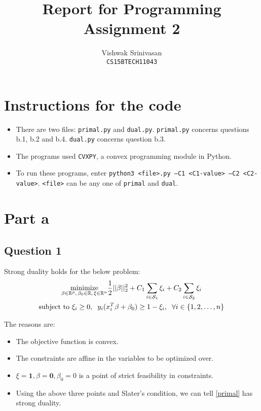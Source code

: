 \documentclass{article}
\title{Report for Programming Assignment 2}
\author{Vishwak Srinivasan\\
\texttt{CS15BTECH11043}}
\date{}
\newcommand{\setS}{\mathcal{S}}
\newcommand{\real}{\mathbb{R}}
\newcommand{\minimize}{\mathop{\mathrm{minimize}}}
\newcommand{\minimizewrt}[1]{\underset{#1}{\minimize}}
\begin{document}
\maketitle

\section*{Instructions for the code}
\begin{itemize}
\item There are two files: \texttt{primal.py} and \texttt{dual.py}. \texttt{primal.py} concerns questions b.1, b.2 and b.4. \texttt{dual.py} concerns question b.3.
\item The programs used \texttt{CVXPY}, a convex programming module in Python.
\item To run these programs, enter \texttt{python3 <file>.py --C1 <C1-value> --C2 <C2-value>}. \texttt{<file>} can be any one of \texttt{primal} and \texttt{dual}.
\end{itemize}

\section*{Part a}
\subsection*{Question 1}
\begin{flushleft}
Strong duality holds for the below problem:
\begin{multline}
\label{primal}
\minimizewrt{\beta \in \real^{p}, \hspace{0.5mm} \beta_{0} \in \real, \hspace{0.5mm} \xi \in \real^{n}} \frac{1}{2}||\beta||_{2}^{2} + C_{1}\sum_{i \in \setS_{1}} \xi_{i} + C_{2}\sum_{i \in \setS_{2}} \xi_{i} \\
\text{subject to } \xi_{i} \geq 0, \hspace{2mm} y_{i}(x_{i}^{T}\beta + \beta_{0}) \geq 1 - \xi_{i}, \hspace{2mm} \forall i \in \{1, 2, \ldots, n\}
\end{multline}

The reasons are:
\begin{itemize}
\item The objective function is convex.
\item The constraints are affine in the variables to be optimized over.
\item \(\xi = \mathbf{1}, \beta = \mathbf{0}, \beta_{0} = 0\) is a point of strict feasibility in constraints.
\item Using the above three points and Slater's condition, we can tell \ref{primal} has strong duality.
\end{itemize}
\end{flushleft}
\end{document}
